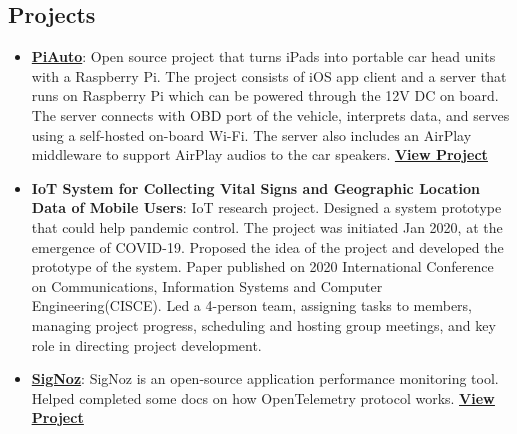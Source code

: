 \documentclass[letterpaper,11pt]{article}
\newcommand{\resumeItem}[2]{
  \item\small{
    \textbf{#1}{: #2 \vspace{-2pt}}
  }
}
\newcommand{\resumeSubItem}[2]{\resumeItem{#1}{#2}\vspace{-4pt}}
\newcommand{\resumeSubHeadingListStart}{\begin{itemize}[leftmargin=*]}
\newcommand{\resumeSubHeadingListEnd}{\end{itemize}}
\begin{document}
\begin{CJK*}{UTF8}{gbsn}
\section{Projects}
  \resumeSubHeadingListStart
    \resumeSubItem{\href{https://github.com/EthanGeekFan/PiAuto}{PiAuto}}
      {Open source project that turns iPads into portable car head units with a Raspberry Pi. The project consists of iOS app client and a server that runs on Raspberry Pi which can be powered through the 12V DC on board. The server connects with OBD port of the vehicle, interprets data, and serves using a self-hosted on-board Wi-Fi. The server also includes an AirPlay middleware to support AirPlay audios to the car speakers. \textbf{\href{https://github.com/EthanGeekFan/PiAuto}{\underline{View Project}}}}
    \resumeSubItem{IoT System for Collecting Vital Signs and Geographic Location Data of Mobile Users}
      {IoT research project. Designed a system prototype that could help pandemic control. The project was initiated Jan 2020, at the emergence of COVID-19. Proposed the idea of the project and developed the prototype of the system. Paper published on 2020 International Conference on Communications, Information Systems and Computer Engineering(CISCE). Led a 4-person team, assigning tasks to members, managing project progress, scheduling and hosting group meetings, and key role in directing project development.}
    \resumeSubItem{\href{https://signoz.io/}{SigNoz}}
      {SigNoz is an open-source application performance monitoring tool. Helped completed some docs on how OpenTelemetry protocol works. \textbf{\href{https://signoz.io/}{\underline{View Project}}}}
  \resumeSubHeadingListEnd

\end{CJK*}
\end{document}
